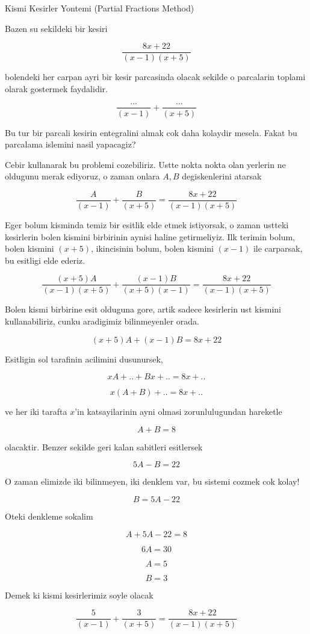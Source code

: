 \documentclass[12pt,fleqn]{article}
\begin{document}
Kismi Kesirler Yontemi (Partial Fractions Method)

Bazen su sekildeki bir kesiri 

\[ \frac{8x + 22}{(x-1)(x+5)} \]

bolendeki her carpan ayri bir kesir parcasinda olacak sekilde o parcalarin
toplami olarak gostermek faydalidir. 

\[ \frac{...}{(x-1)} + \frac{...}{(x+5)} \]

Bu tur bir parcali kesirin entegralini almak cok daha kolaydir
mesela. Fakat bu parcalama islemini nasil yapacagiz?

Cebir kullanarak bu problemi cozebiliriz. Ustte nokta nokta olan yerlerin
ne oldugunu merak ediyoruz, o zaman onlara $A,B$ degiskenlerini atarsak

\[ \frac{A}{(x-1)} + \frac{B}{(x+5)} = \frac{8x + 22}{(x-1)(x+5)}\]

Eger bolum kisminda temiz bir esitlik elde etmek istiyorsak, o zaman
ustteki kesirlerin bolen kismini birbirinin aynisi haline getirmeliyiz. Ilk
terimin bolum, bolen kismini $(x+5)$, ikincisinin bolum, bolen kismini
$(x-1)$ ile carparsak, bu esitligi elde ederiz. 

\[ \frac{(x+5)A}{(x-1)(x+5)} + \frac{(x-1)B}{(x+5)(x-1)} = 
\frac{8x + 22}{(x-1)(x+5)}
\]


Bolen kismi birbirine esit olduguna gore, artik sadece kesirlerin ust
kismini kullanabiliriz, cunku aradigimiz bilinmeyenler orada. 

\[ (x+5)A + (x-1)B = 8x+22 \]

Esitligin sol tarafinin acilimini dusunursek, 

\[ xA + .. + Bx + .. = 8x + .. \]

\[ x(A + B) +  .. = 8x + .. \]


ve her iki tarafta $x$'in katsayilarinin ayni olmasi zorunlulugundan
hareketle

\[ A + B = 8 \]

olacaktir. Benzer sekilde geri kalan sabitleri esitlersek 

\[ 5A - B = 22 \]

O zaman elimizde iki bilinmeyen, iki denklem var, bu sistemi cozmek cok
kolay! 

\[ B = 5A - 22 \]

Oteki denkleme sokalim

\[ A + 5A - 22 = 8 \]

\[ 6A = 30 \]

\[ A = 5 \]

\[ B = 3 \]

Demek ki kismi kesirlerimiz soyle olacak 

\[ \frac{5}{(x-1)} + \frac{3}{(x+5)} = \frac{8x + 22}{(x-1)(x+5)}\]
\end{document}
